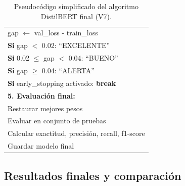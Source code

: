 \begin{table}[htbp]
{\begin{tabular}{|l|l|}
\multicolumn{2}{|l|}{\quad gap $\leftarrow$ val\_loss - train\_loss} \\
\multicolumn{2}{|l|}{\quad \textbf{Si} gap $<$ 0.02: ``EXCELENTE''} \\
\multicolumn{2}{|l|}{\quad \textbf{Si} 0.02 $\leq$ gap $<$ 0.04: ``BUENO''} \\
\multicolumn{2}{|l|}{\quad \textbf{Si} gap $\geq$ 0.04: ``ALERTA''} \\
\multicolumn{2}{|l|}{\quad \textbf{Si} early\_stopping activado: \textbf{break}} \\
\multicolumn{2}{|l|}{\textbf{5. Evaluación final:}} \\
\multicolumn{2}{|l|}{Restaurar mejores pesos} \\
\multicolumn{2}{|l|}{Evaluar en conjunto de pruebas} \\
\multicolumn{2}{|l|}{Calcular exactitud, precisión, recall, f1-score} \\
\multicolumn{2}{|l|}{Guardar modelo final} \\
\hline
\end{tabular}
}
\caption{Pseudocódigo simplificado del algoritmo DistilBERT final (V7).}
\label{tab:pseudocodigo_distilbert_simple}
\end{table}



\subsection{Resultados finales y comparación}
\label{subsec:resultados_comparacion}

\begin{table}[htbp]
\centering
{}
\caption{Métricas finales del modelo DistilBERT optimizado.}
\label{tab:metricas_finales}
\end{table}

